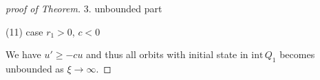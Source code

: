 \documentclass{amsart}
\def\red{\color{red}}
\def\blue{\color{blue}}
\theoremstyle{definition}
\numberwithin{equation}{section}
\def\ii{{\textrm{int}}\,}
\begin{document}
\begin{proof}[proof of Theorem]
3. {\red unbounded part}

% 
% 
% 


\bigskip\bigskip

(11) case $r_1>0$, $c<0$

We have $u' \ge -c u$ and thus all orbits with initial state in $\ii Q_1$ becomes unbounded as $\xi \rightarrow \infty.$
% 
% 
% 
% 
% 
\end{proof}
\newpage
\end{document}
